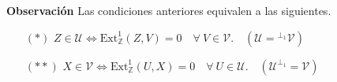 \documentclass[preview]{standalone}
\begin{document}
\begin{center}
\justifying \textbf{Observación} Las condiciones anteriores equivalen a las siguientes.\begin{itemize} \item[$(\ast)$] $Z\in\mathcal{U} \Leftrightarrow \text{Ext}^1_\mathbb{Z}(Z,V)=0 \quad \forall \ V\in\mathcal{V}. \quad (\mathcal{U} = {}^{\perp_1}\mathcal{V})$ \item[$(\ast\ast)$] $X\in\mathcal{V} \Leftrightarrow \text{Ext}^1_\mathbb{Z}(U,X)=0 \quad \forall \ U\in\mathcal{U}. \quad (\mathcal{U}^{\perp_1} = \mathcal{V})$ \end{itemize}
\end{center}
\end{document}
